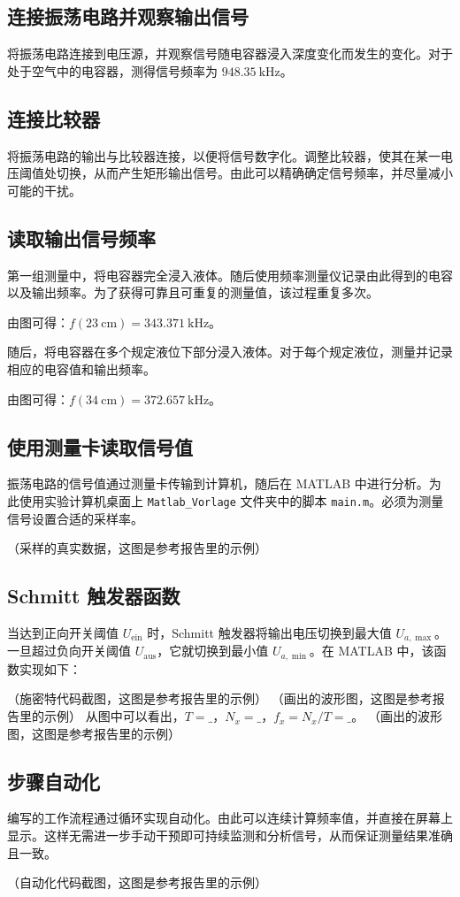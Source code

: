 \subsection{连接振荡电路并观察输出信号}

将振荡电路连接到电压源，并观察信号随电容器浸入深度变化而发生的变化。对于处于空气中的电容器，测得信号频率为 $\SI{948.35}{\kilo\hertz}$。

\subsection{连接比较器}

将振荡电路的输出与比较器连接，以便将信号数字化。调整比较器，使其在某一电压阈值处切换，从而产生矩形输出信号。由此可以精确确定信号频率，并尽量减小可能的干扰。

\subsection{读取输出信号频率}

第一组测量中，将电容器完全浸入液体。随后使用频率测量仪记录由此得到的电容以及输出频率。为了获得可靠且可重复的测量值，该过程重复多次。

由图可得：$f(\SI{23}{\centi\meter}) = \SI{343.371}{\kilo\hertz}$。

随后，将电容器在多个规定液位下部分浸入液体。对于每个规定液位，测量并记录相应的电容值和输出频率。

由图可得：$f(\SI{34}{\centi\meter}) = \SI{372.657}{\kilo\hertz}$。

\subsection{使用测量卡读取信号值}

振荡电路的信号值通过测量卡传输到计算机，随后在 MATLAB 中进行分析。为此使用实验计算机桌面上 \texttt{Matlab\_Vorlage} 文件夹中的脚本 \texttt{main.m}。必须为测量信号设置合适的采样率。

（采样的真实数据，这图是参考报告里的示例）

\subsection{Schmitt 触发器函数}

当达到正向开关阈值 $U_{\mathrm{ein}}$ 时，Schmitt 触发器将输出电压切换到最大值 $U_{a,\max}$。一旦超过负向开关阈值 $U_{\mathrm{aus}}$，它就切换到最小值 $U_{a,\min}$。在 MATLAB 中，该函数实现如下：

（施密特代码截图，这图是参考报告里的示例）
（画出的波形图，这图是参考报告里的示例）
从图中可以看出，$T = \_$，$N_x = \_$，$f_x = N_x/T = \_$。
（画出的波形图，这图是参考报告里的示例）

\subsection{步骤自动化}

编写的工作流程通过循环实现自动化。由此可以连续计算频率值，并直接在屏幕上显示。这样无需进一步手动干预即可持续监测和分析信号，从而保证测量结果准确且一致。

（自动化代码截图，这图是参考报告里的示例）
